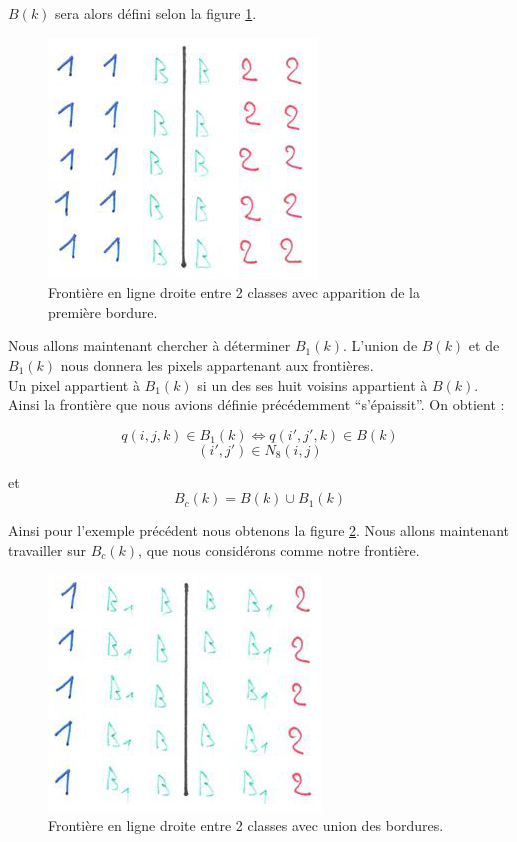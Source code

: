 	$B(k)$ sera alors défini selon la figure \ref{fig:bordure2}.\\
	\begin{figure}[H]
		\centering
		\includegraphics[scale=0.75]{images/bordure-2.jpg}
		\caption{Frontière en ligne droite entre 2 classes avec apparition de la première bordure.}
		\label{fig:bordure2}
	\end{figure}

	Nous allons maintenant chercher à déterminer $B_1(k)$. L'union de $B(k)$ et de $B_1(k)$ nous donnera les pixels appartenant aux frontières.\\

	Un pixel appartient à $B_1(k)$ si un des ses huit voisins appartient à $B(k)$. Ainsi la frontière que nous avions définie précédemment \enquote{s'épaissit}. On obtient :

	\[ q(i,j,k) \in B_1(k) \Leftrightarrow q(i',j',k) \in B(k) \]
	\[ (i',j') \in N_8(i,j) \]

	et \[ B_c(k) = B(k) \cup B_1(k) \]

	Ainsi pour l'exemple précédent nous obtenons la figure \ref{fig:bordure3}. Nous allons maintenant travailler sur $B_c(k)$, que nous considérons comme notre frontière.

	\begin{figure}[H]
		\centering
		\includegraphics[scale=0.75]{images/bordure-3.jpg}
		\caption{Frontière en ligne droite entre 2 classes avec union des bordures.}
		\label{fig:bordure3}
	\end{figure}

